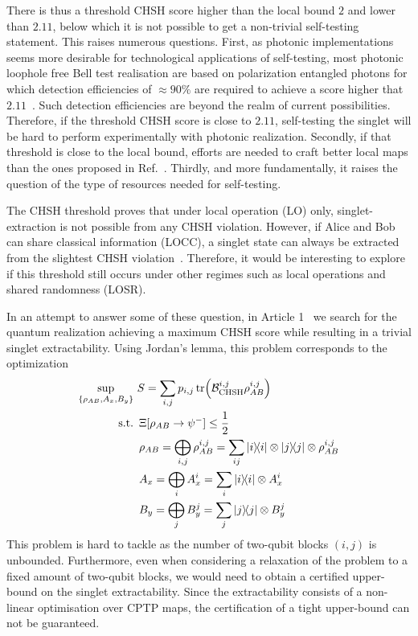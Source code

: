 \medbreak

There is thus a threshold CHSH score higher than the local bound $2$ and lower than $2.11$, below which it is not possible to get a non-trivial self-testing statement.
This raises numerous questions. 
First, as photonic implementations seems more desirable for technological applications of self-testing, most photonic loophole free Bell test realisation are based on polarization entangled photons for which detection efficiencies of $\approx 90\%$ are required to achieve a score higher that $2.11$~\cite{Vivoli2015b}. 
Such detection efficiencies are beyond the realm of current possibilities. 
Therefore, if the threshold CHSH score is close to $2.11$, self-testing the singlet will be hard to perform experimentally with photonic realization.
Secondly, if that threshold is close to the local bound, efforts are needed to craft better local maps than the ones proposed in Ref.~\cite{Kaniewski2016}.
Thirdly, and more fundamentally, it raises the question of the type of resources needed for self-testing.

The CHSH threshold proves that under local operation (LO) only, singlet-extraction is not possible from any CHSH violation.
However, if Alice and Bob can share classical information (LOCC), a singlet state can always be extracted from the slightest CHSH violation~\cite{Bardyn2009}. 
Therefore, it would be interesting to explore if this threshold still occurs under other regimes such as local operations and shared randomness (LOSR).

\medbreak

In an attempt to answer some of these question, in Article 1~\cite{Valcarce2020} we search for the quantum realization achieving a maximum CHSH score while resulting in a trivial singlet extractability.
Using Jordan's lemma, this problem corresponds to the optimization
\begin{equation}
	\begin{split}
		\sup_{\{\rho_{AB},A_x,B_y\}}\ &S=\sum_{i,j} p_{i,j} \tr (\mathcal{B}_\text{CHSH}^{i,j} \rho_{AB}^{i,j})\\
\textnormal{s.t.}\ &\,\Xi[\rho_{AB}\rightarrow \psi^-] \leq \frac{1}{2} \\
				   &\, \rho_{AB} = \bigoplus_{i,j} \rho_{AB}^{i,j} = \sum_{ij} \ketbra{i} \otimes \ketbra{j} \otimes \rho_{AB}^{i,j} \\
				   &\, A_x = \bigoplus_{i} A_x^i = \sum_{i} \ketbra{i} \otimes A_x^{i} \\
				   &\, B_y = \bigoplus_{j} B_y^j = \sum_{j} \ketbra{j} \otimes B_y^{j}
	\end{split}
	\label{eq:CHSH_threshold}
\end{equation}
This problem is hard to tackle as the number of two-qubit blocks $(i,j)$ is unbounded.
Furthermore, even when considering a relaxation of the problem to a fixed amount of two-qubit blocks, we would need to obtain a certified upper-bound on the singlet extractability.
Since the extractability consists of a non-linear optimisation over CPTP maps, the certification of a tight upper-bound can not be guaranteed.

